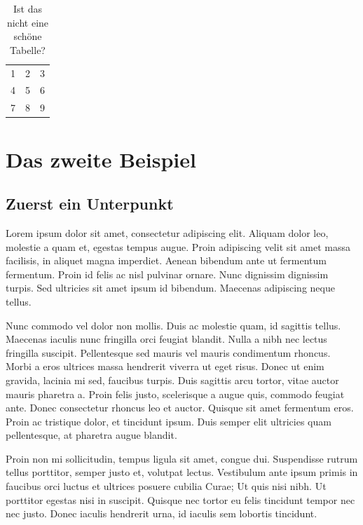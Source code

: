 \begin{table}
	\begin{center}
		\begin{tabular}{| l c r |}
			\hline
			1 & 2 & 3 \\
			4 & 5 & 6 \\
			7 & 8 & 9 \\
			\hline
		\end{tabular}
	\end{center}
	\caption{Ist das nicht eine schöne Tabelle?}
\end{table}

\section{Das zweite Beispiel}

\subsection{Zuerst ein Unterpunkt}
Lorem ipsum dolor sit amet, consectetur adipiscing elit. Aliquam dolor leo, molestie a quam et, egestas tempus augue. Proin adipiscing velit sit amet massa facilisis, in aliquet magna imperdiet. Aenean bibendum ante ut fermentum fermentum. Proin id felis ac nisl pulvinar ornare. Nunc dignissim dignissim turpis. Sed ultricies sit amet ipsum id bibendum. Maecenas adipiscing neque tellus.

Nunc commodo vel dolor non mollis. Duis ac molestie quam, id sagittis tellus. Maecenas iaculis nunc fringilla orci feugiat blandit. Nulla a nibh nec lectus fringilla suscipit. Pellentesque sed mauris vel mauris condimentum rhoncus. Morbi a eros ultrices massa hendrerit viverra ut eget risus. Donec ut enim gravida, lacinia mi sed, faucibus turpis. Duis sagittis arcu tortor, vitae auctor mauris pharetra a. Proin felis justo, scelerisque a augue quis, commodo feugiat ante. Donec consectetur rhoncus leo et auctor. Quisque sit amet fermentum eros. Proin ac tristique dolor, et tincidunt ipsum. Duis semper elit ultricies quam pellentesque, at pharetra augue blandit.

Proin non mi sollicitudin, tempus ligula sit amet, congue dui. Suspendisse rutrum tellus porttitor, semper justo et, volutpat lectus. Vestibulum ante ipsum primis in faucibus orci luctus et ultrices posuere cubilia Curae; Ut quis nisi nibh. Ut porttitor egestas nisi in suscipit. Quisque nec tortor eu felis tincidunt tempor nec nec justo. Donec iaculis hendrerit urna, id iaculis sem lobortis tincidunt.

